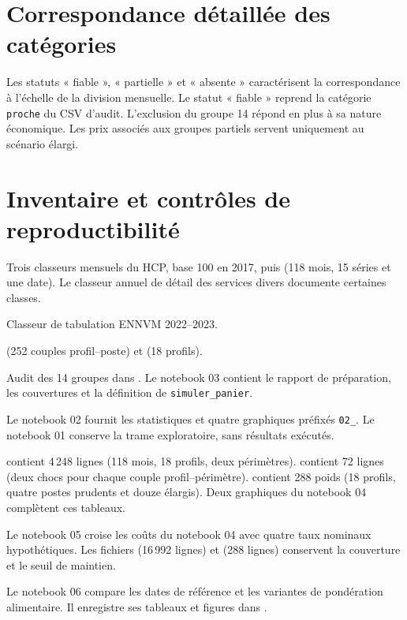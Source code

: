 \chapter{Correspondance détaillée des catégories}\label{ann:correspondance}
Les statuts « fiable », « partielle » et « absente » caractérisent la correspondance à l'échelle de la division mensuelle. Le statut « fiable » reprend la catégorie \texttt{proche} du CSV d'audit. L'exclusion du groupe 14 répond en plus à sa nature économique. Les prix associés aux groupes partiels servent uniquement au scénario élargi.


\chapter{Inventaire et contrôles de reproductibilité}\label{ann:trace}
\begin{description}\raggedright
\item[Données de prix.] Trois classeurs mensuels du HCP, base 100 en 2017, puis  (118 mois, 15 séries et une date). Le classeur annuel de détail des services divers documente certaines classes.
\item[Données de dépenses.] Classeur de tabulation ENNVM 2022--2023.
\par {} (252 couples profil--poste) et  (18 profils).
\item[Correspondance.] Audit des 14 groupes dans . Le notebook 03 contient le rapport de préparation, les couvertures et la définition de \texttt{simuler\_panier}.
\item[Analyse de l'IPC.] Le notebook 02 fournit les statistiques et quatre graphiques préfixés \texttt{02\_}. Le notebook 01 conserve la trame exploratoire, sans résultats exécutés.
\item[Simulations.]  contient 4\,248 lignes (118 mois, 18 profils, deux périmètres).  contient 72 lignes (deux chocs pour chaque couple profil--périmètre).  contient 288 poids (18 profils, quatre postes prudents et douze élargis). Deux graphiques du notebook 04 complètent ces tableaux.
\item[Scénarios de ressources.] Le notebook 05 croise les coûts du notebook 04 avec quatre taux nominaux hypothétiques. Les fichiers  (16\,992 lignes) et  (288 lignes) conservent la couverture et le seuil de maintien.
\item[Robustesse.] Le notebook 06 compare les dates de référence et les variantes de pondération alimentaire. Il enregistre ses tableaux et figures dans .
\end{description}

